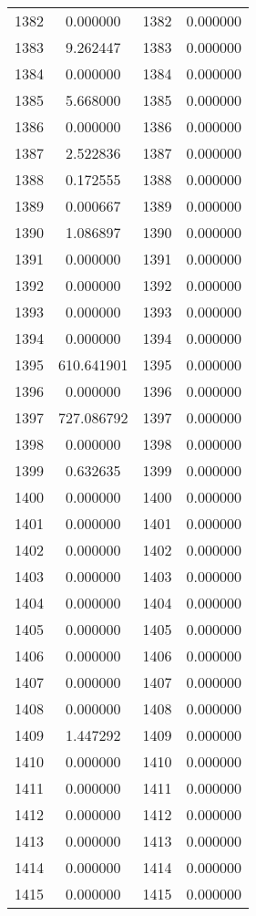 \documentclass[12pt]{article}
\begin{document}
\begin{longtable}{@{}cccc@{}}
1382 & 0.000000 & 1382 & 0.000000 \\
1383 & 9.262447 & 1383 & 0.000000 \\
1384 & 0.000000 & 1384 & 0.000000 \\
1385 & 5.668000 & 1385 & 0.000000 \\
1386 & 0.000000 & 1386 & 0.000000 \\
1387 & 2.522836 & 1387 & 0.000000 \\
1388 & 0.172555 & 1388 & 0.000000 \\
1389 & 0.000667 & 1389 & 0.000000 \\
1390 & 1.086897 & 1390 & 0.000000 \\
1391 & 0.000000 & 1391 & 0.000000 \\
1392 & 0.000000 & 1392 & 0.000000 \\
1393 & 0.000000 & 1393 & 0.000000 \\
1394 & 0.000000 & 1394 & 0.000000 \\
1395 & 610.641901 & 1395 & 0.000000 \\
1396 & 0.000000 & 1396 & 0.000000 \\
1397 & 727.086792 & 1397 & 0.000000 \\
1398 & 0.000000 & 1398 & 0.000000 \\
1399 & 0.632635 & 1399 & 0.000000 \\
1400 & 0.000000 & 1400 & 0.000000 \\
1401 & 0.000000 & 1401 & 0.000000 \\
1402 & 0.000000 & 1402 & 0.000000 \\
1403 & 0.000000 & 1403 & 0.000000 \\
1404 & 0.000000 & 1404 & 0.000000 \\
1405 & 0.000000 & 1405 & 0.000000 \\
1406 & 0.000000 & 1406 & 0.000000 \\
1407 & 0.000000 & 1407 & 0.000000 \\
1408 & 0.000000 & 1408 & 0.000000 \\
1409 & 1.447292 & 1409 & 0.000000 \\
1410 & 0.000000 & 1410 & 0.000000 \\
1411 & 0.000000 & 1411 & 0.000000 \\
1412 & 0.000000 & 1412 & 0.000000 \\
1413 & 0.000000 & 1413 & 0.000000 \\
1414 & 0.000000 & 1414 & 0.000000 \\
1415 & 0.000000 & 1415 & 0.000000 \\

\end{longtable}
\end{document}
